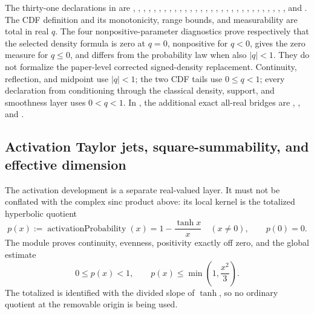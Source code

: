 \documentclass[11pt]{article}
\numberwithin{equation}{section}
\theoremstyle{definition}
\theoremstyle{remark}
\begin{document}
The thirty-one declarations in  are
,
,
,
,
,
,
,
,
,
,
,
,
,
,
,
,
,
,
,
,
,
,
,
,
,
,
,
,
,
, and
.
The CDF definition and its monotonicity, range bounds, and measurability are total in real
\(q\).  The four nonpositive-parameter diagnostics prove respectively that the selected
density formula is zero at \(q=0\), nonpositive for \(q<0\), gives the zero
 measure for \(q\le0\), and differs from the probability law when
also \(|q|<1\).  They do not formalize the paper-level corrected signed-density replacement.
Continuity, reflection, and
midpoint use \(|q|<1\); the two CDF tails use
\(0\le q<1\); every declaration from conditioning through the classical density,
support, and smoothness layer uses \(0<q<1\).  In
, the additional exact all-real bridges are
,
, and
.

\subsection{Activation Taylor jets, square-summability, and effective dimension}
The activation development is a separate real-valued layer.  It must not be conflated with
the complex sinc product above: its local kernel is the totalized hyperbolic quotient
\[
 p(x):=\operatorname{activationProbability}(x)
 =1-\frac{\tanh x}{x}\quad(x\ne0),\qquad p(0)=0.
\]
The module  proves continuity, evenness, positivity exactly
off zero, and the global estimate
\[
 0\le p(x)<1,\qquad p(x)\le\min\left(1,\frac{x^2}{3}\right).
\]
The totalized  is identified with the divided slope of \(\tanh\), so no
ordinary quotient at the removable origin is being used.
\end{document}
